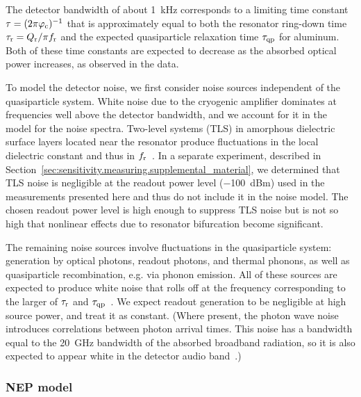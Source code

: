 The detector bandwidth of about \SI{1}{kHz} corresponds to a limiting time constant $\tau = (2 \pi \varphi_{\mathrm{c}})^{-1}$ that is approximately equal to both the resonator ring-down time $\tau_{\mathrm{r}} = Q_{\mathrm{r}} / \pi f_{\mathrm{r}}$ and the expected quasiparticle relaxation time $\tau_{\mathrm{qp}}$ for aluminum.
Both of these time constants are expected to decrease as the absorbed optical power increases, as observed in the data.

To model the detector noise, we first consider noise sources independent of the quasiparticle system.
White noise due to the cryogenic amplifier dominates at frequencies well above the detector bandwidth, and we account for it in the model for the noise spectra.
Two-level systems (TLS) in amorphous dielectric surface layers located near the resonator produce fluctuations in the local dielectric constant and thus in $f_{\mathrm{r}}$~\autocite{Gao2008bAPL}.
In a separate experiment, described in Section~\ref{sec:sensitivity.measuring.supplemental_material}, we determined that TLS noise is negligible at the readout power level (\SI{-100}{dBm}) used in the measurements presented here and thus do not include it in the noise model.
The chosen readout power level is high enough to suppress TLS noise but is not so high that nonlinear effects due to resonator bifurcation become significant.

The remaining noise sources involve fluctuations in the quasiparticle system: generation by optical photons, readout photons, and thermal phonons, as well as quasiparticle recombination, e.g. via phonon emission.
All of these sources are expected to produce white noise that rolls off at the frequency corresponding to the larger of $\tau_{\mathrm{r}}$ and $\tau_{\mathrm{qp}}$~\autocite{Zmuidzinas2012ARCMP}.
We expect readout generation to be negligible at high source power, and treat it as constant.
(Where present, the photon wave noise introduces correlations between photon arrival times.
This noise has a bandwidth equal to the \SI{20}{GHz} bandwidth of the absorbed broadband radiation, so it is also expected to appear white in the detector audio band~\autocite{Zmuidzinas2003ApplOpt}.)


\subsubsection{NEP model}


